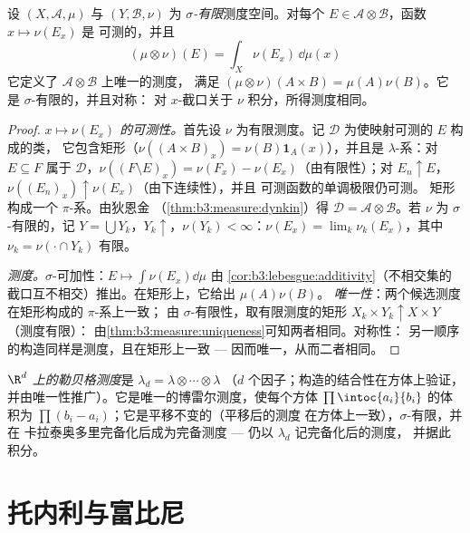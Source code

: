 \begin{theorem}[乘积测度]\label{thm:b3:product:existence}
设 $(X, \mathcal A, \mu)$ 与 $(Y, \mathcal B, \nu)$ 为
\emph{$\sigma$-有限}测度空间。对每个 $E \in \mathcal
A\otimes\mathcal B$，函数 $x \mapsto \nu(E_x)$ 是
可测的，并且
\[
(\mu\otimes\nu)(E) = \int_X \nu(E_x)\,\dd\mu(x)
\]
它定义了 $\mathcal A\otimes\mathcal B$ 上唯一的测度，
满足 $(\mu\otimes\nu)(A\times B) = \mu(A)\nu(B)$。它
是 $\sigma$-有限的，并且对称：
对 $x$-截口关于 $\nu$ 积分，所得测度相同。
\end{theorem}

\begin{proof}
\emph{$x \mapsto \nu(E_x)$ 的可测性。}首先设 $\nu$
为有限测度。记 $\mathcal D$ 为使映射可测的 $E$ 构成的类，
它包含矩形（$\nu((A\times B)_x) =
\nu(B)\mathbf 1_A(x)$），并且是 $\lambda$-系：对 $E
\subseteq F$ 属于 $\mathcal D$，$\nu((F\setminus E)_x) =
\nu(F_x) - \nu(E_x)$（由有限性）；对 $E_n \uparrow E$，
$\nu((E_n)_x) \uparrow \nu(E_x)$（由下连续性），并且
可测函数的单调极限仍可测。
矩形构成一个 $\pi$-系。由狄恩金
（\cref{thm:b3:measure:dynkin}）得 $\mathcal D = \mathcal
A\otimes\mathcal B$。若 $\nu$ 为 $\sigma$-有限的，记 $Y =
\bigcup Y_k$，$Y_k \uparrow$，$\nu(Y_k) < \infty$：$\nu(E_x) =
\lim_k\nu_k(E_x)$，其中 $\nu_k = \nu(\cdot\cap Y_k)$ 有限。

\emph{测度。}$\sigma$-可加性：$E \mapsto
\int\nu(E_x)\dd\mu$ 由
\cref{cor:b3:lebesgue:additivity}（不相交集的截口互不相交）推出。在矩形上，它给出
$\mu(A)\nu(B)$。
\emph{唯一性}：两个候选测度在矩形构成的 $\pi$-系上一致；
由 $\sigma$-有限性，取有限测度的矩形 $X_k\times
Y_k \uparrow X\times Y$（测度有限）：
由\cref{thm:b3:measure:uniqueness}可知两者相同。对称性：
另一顺序的构造同样是测度，且在矩形上一致 ---
因而唯一，从而二者相同。
\end{proof}

\begin{definition}\label{def:b3:product:lebesgue}
\emph{$\R^d$ 上的勒贝格测度}是 $\lambda_d = \lambda\otimes\cdots\otimes\lambda$
（$d$ 个因子；构造的结合性在方体上验证，
并由唯一性推广）。它是唯一的博雷尔测度，使每个方体
$\prod\intoc{a_i}{b_i}$ 的体积为
$\prod(b_i - a_i)$；它是平移不变的（平移后的测度
在方体上一致），$\sigma$-有限，并在
卡拉泰奥多里完备化后成为完备测度 --- 仍以 $\lambda_d$ 记完备化后的测度，
并据此积分。
\end{definition}

\section{托内利与富比尼}

